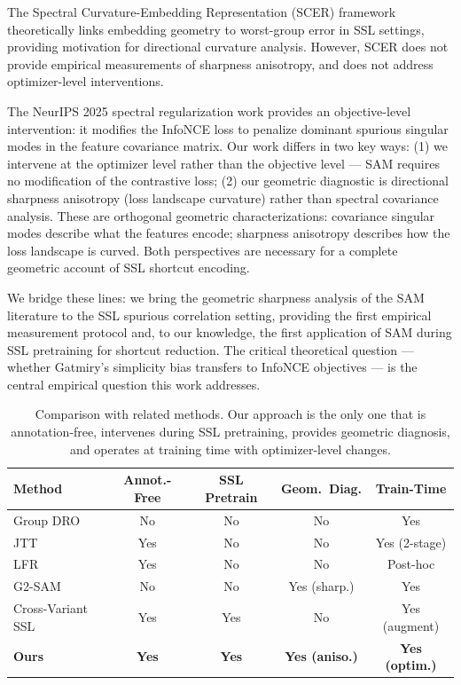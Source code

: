 The Spectral Curvature-Embedding Representation (SCER) framework \citep{park2025g2sam} theoretically links embedding geometry to worst-group error in SSL settings, providing motivation for directional curvature analysis. However, SCER does not provide empirical measurements of sharpness anisotropy, and does not address optimizer-level interventions.

The NeurIPS 2025 spectral regularization work \citep{chen2025spectral} provides an objective-level intervention: it modifies the InfoNCE loss to penalize dominant spurious singular modes in the feature covariance matrix. Our work differs in two key ways: (1) we intervene at the optimizer level rather than the objective level --- SAM requires no modification of the contrastive loss; (2) our geometric diagnostic is directional sharpness anisotropy (loss landscape curvature) rather than spectral covariance analysis. These are orthogonal geometric characterizations: covariance singular modes describe what the features encode; sharpness anisotropy describes how the loss landscape is curved. Both perspectives are necessary for a complete geometric account of SSL shortcut encoding.

We bridge these lines: we bring the geometric sharpness analysis of the SAM literature to the SSL spurious correlation setting, providing the first empirical measurement protocol and, to our knowledge, the first application of SAM during SSL pretraining for shortcut reduction. The critical theoretical question --- whether Gatmiry's simplicity bias transfers to InfoNCE objectives --- is the central empirical question this work addresses.

\begin{table}[t]
\caption{Comparison with related methods. Our approach is the only one that is annotation-free, intervenes during SSL pretraining, provides geometric diagnosis, and operates at training time with optimizer-level changes.}
\label{tab:comparison}
\begin{center}
\begin{tabular}{lcccc}
\toprule
\textbf{Method} & \textbf{Annot.-Free} & \textbf{SSL Pretrain} & \textbf{Geom.\ Diag.} & \textbf{Train-Time} \\
\midrule
Group DRO \citep{sagawa2019dro} & No & No & No & Yes \\
JTT \citep{liu2021jtt} & Yes & No & No & Yes (2-stage) \\
LFR \citep{ghaznavi2023lfr} & Yes & No & No & Post-hoc \\
G2-SAM \citep{park2025g2sam} & No & No & Yes (sharp.) & Yes \\
Cross-Variant SSL \citep{yadav2026crossvariant} & Yes & Yes & No & Yes (augment) \\
\textbf{Ours} & \textbf{Yes} & \textbf{Yes} & \textbf{Yes (aniso.)} & \textbf{Yes (optim.)} \\
\bottomrule
\end{tabular}
\end{center}
\end{table}
